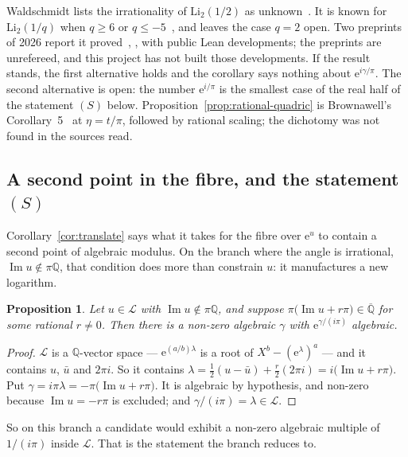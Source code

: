 \documentclass[11pt,a4paper]{article}
\theoremstyle{plain}
\newtheorem{proposition}[theorem]{Proposition}
\theoremstyle{definition}
\newcommand{\e}{\mathrm{e}}
\newcommand{\Q}{\mathbb{Q}}
\newcommand{\Alg}{\overline{\mathbb{Q}}}
\newcommand{\Logs}{\mathcal{L}}
\begin{document}
Waldschmidt lists the irrationality of $\mathrm{Li}_{2}(1/2)$ as
unknown~\cite[p.~274]{waldschmidt-odp}. It is known for $\mathrm{Li}_{2}(1/q)$ when $q\ge6$ or
$q\le-5$~\cite{hata-1993,rhin-viola-2005}, and \cite[Remark~2.8.2]{calegari-dimitrov-tang} leaves
the case $q=2$ open. Two preprints of 2026 report it proved~\cite[Theorem~1.3]{tan-zhang-2026},
\cite[p.~2]{lai-2026}, with public Lean developments; the preprints are unrefereed, and this project
has not built those developments. If the result stands, the first alternative holds and the
corollary says nothing about $\e^{i\gamma/\pi}$. The second alternative is open: the number
$\e^{i/\pi}$ is the smallest case of the real half of the statement $(S)$ below. Proposition~\ref{prop:rational-quadric} is Brownawell's
Corollary~5~\cite[p.~23]{brownawell-1974} at $\eta=t/\pi$, followed by rational scaling; the
dichotomy was not found in the sources read.

\subsection*{A second point in the fibre, and the statement \texorpdfstring{$(S)$}{(S)}}

Corollary~\ref{cor:translate} says what it takes for the fibre over $\e^{u}$ to contain a second
point of algebraic modulus. On the branch where the angle is irrational, $\operatorname{Im}u\notin\pi\Q$,
that condition does more than constrain $u$: it manufactures a new logarithm.

\begin{proposition}\label{prop:period-aligned}
Let $u\in\Logs$ with $\operatorname{Im}u\notin\pi\Q$, and suppose
$\pi\bigl(\operatorname{Im}u+r\pi\bigr)\in\Alg$ for some rational $r\neq0$. Then there is a
non-zero algebraic $\gamma$ with $\e^{\gamma/(i\pi)}$ algebraic.
\end{proposition}

\begin{proof}
$\Logs$ is a $\Q$-vector space --- $\e^{(a/b)\lambda}$ is a root of $X^{b}-(\e^{\lambda})^{a}$ ---
and it contains $u$, $\bar u$ and $2\pi i$. So it contains
$\lambda=\tfrac12(u-\bar u)+\tfrac r2(2\pi i)=i\bigl(\operatorname{Im}u+r\pi\bigr)$. Put
$\gamma=i\pi\lambda=-\pi\bigl(\operatorname{Im}u+r\pi\bigr)$. It is algebraic by hypothesis, and
non-zero because $\operatorname{Im}u=-r\pi$ is excluded; and $\gamma/(i\pi)=\lambda\in\Logs$.
\end{proof}

So on this branch a candidate would exhibit a non-zero algebraic multiple of $1/(i\pi)$ inside
$\Logs$. That is the statement the branch reduces to.
\end{document}
